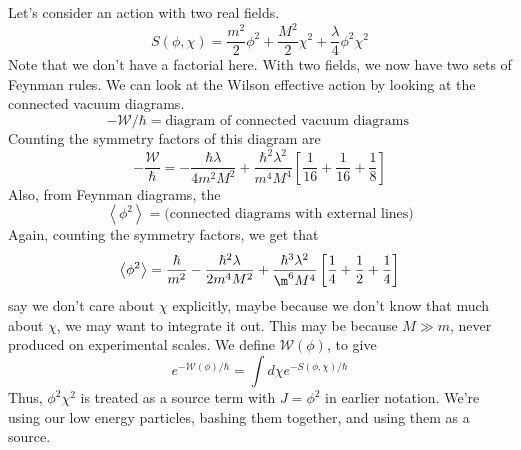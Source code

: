 \documentclass[11pt, oneside]{article}   	%
\theoremstyle{slanted}
\begin{document}
Let's consider an action 
with two real fields. 
\[
 S \left( \phi , \chi  \right)  = \frac{m ^ 2 }{ 2 } \phi ^ 2 
 + \frac{ M ^ 2 }{ 2 } \chi ^2  + \frac{\lambda}{4 } \phi ^ 2 \chi ^ 2 
\] Note that we don't have a factorial here. 
With two fields, 
we now have two sets of Feynman rules. 
We can look at the 
Wilson effective action 
by looking at the connected vacuum diagrams. 
\[
  - \mathcal{ W } / \hbar   = \text{diagram of connected vacuum diagrams }
\] Counting 
the symmetry factors of 
this diagram are 
\[
  - \frac{\mathcal{ W } }{ \hbar }  = 
   - \frac{\hbar \lambda }{ 4 m^ 2 M ^ 2 } + \frac{\hbar ^ 2 \lambda ^ 2 }{ 
   m ^ 4 M ^ 4 } \left[  \frac{1}{16 } + \frac{1}{16 } + \frac{1}{8 } \right] 
\] Also, from 
Feynman diagrams, 
the 
\[
	\left< \phi ^ 2  \right>    = \text{(connected diagrams with external lines)}
\] Again, counting the 
symmetry factors, we get that 
\[
 \left< \phi ^ 2  \right>  = \frac{\hbar}{m ^ 2 }
  - \frac{\hbar ^ 2 \lambda }{ 2 m ^ 4 M^ 2 } + \frac{\hbar ^ 3 \lambda ^ 2  }{ 
  \m ^ 6 M ^ 4 } \left[  \frac{1}{4  } + \frac{1}{2 } + \frac{1}{4 } \right] 
\] say we don't care about $ \chi $ 
explicitly,
maybe because we don't know that much about $ \chi $, 
we may want to integrate it out. 
This may be because $ M \gg  m $, never 
produced on experimental scales. 
We define $ \mathcal{ W } \left(  \phi  \right)  $, 
to give 
\[
	e ^{  - \mathcal{  W } \left( \phi  \right)   / \hbar } 
	= \int d \chi e ^{  - S \left( \phi , \chi  \right)   / \hbar }
\] Thus, $ \phi ^ 2 \chi ^ 2 $ is treated 
as a source term with $ J  = \phi ^ 2 $ in earlier 
notation. We're using our low energy 
particles, bashing them together, 
and using them as a source. 
\end{document}

